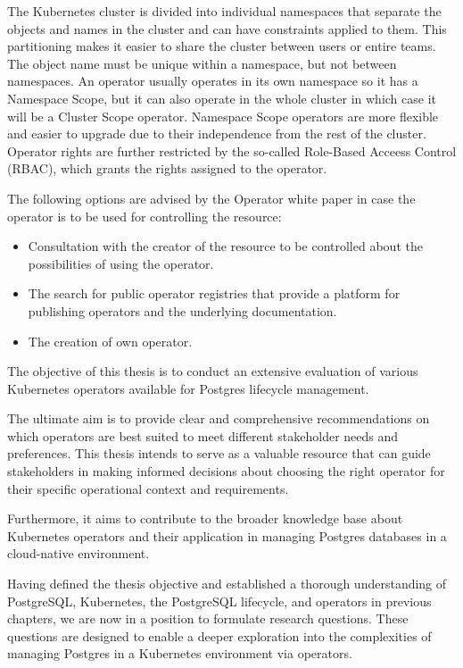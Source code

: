 The Kubernetes cluster is divided into individual namespaces that separate the objects and names in the cluster and can have constraints applied to them. This partitioning makes it easier to share the cluster between users or entire teams. The object name must be unique within a namespace, but not between namespaces.  An operator usually operates in its own namespace so it has a Namespace Scope, but it can also operate in the whole cluster in which case it will be a Cluster Scope operator. Namespace Scope operators are more flexible and easier to upgrade due to their independence from the rest of the cluster. Operator rights are further restricted by the so-called Role-Based Acceess Control (RBAC), which grants the rights assigned to the operator. \cite{ operatorsAtK8sIface}

The following options are advised by the Operator white paper \cite{operatorWhitepaper} in case the operator is to be used for controlling the resource:
\begin{itemize}
    \item	Consultation with the creator of the resource to be controlled about the possibilities of using the operator.
    \item	The search for public operator registries that provide a platform for publishing operators and the underlying documentation.
    \item	The creation of own operator.
\end{itemize}

\label{chap:objectives}
The objective of this thesis is to conduct an extensive evaluation of various Kubernetes operators available for Postgres lifecycle management.

The ultimate aim is to provide clear and comprehensive recommendations on which operators are best suited to meet different stakeholder needs and preferences. This thesis intends to serve as a valuable resource that can guide stakeholders in making informed decisions about choosing the right operator for their specific operational context and requirements.

Furthermore, it aims to contribute to the broader knowledge base about Kubernetes operators and their application in managing Postgres databases in a cloud-native environment.


\label{chap:resoourceQuestions}
Having defined the thesis objective and established a thorough understanding of PostgreSQL, Kubernetes, the PostgreSQL lifecycle, and operators in previous chapters, we are now in a position to formulate research questions.
These questions are designed to enable a deeper exploration into the complexities of managing Postgres in a Kubernetes environment via operators.

